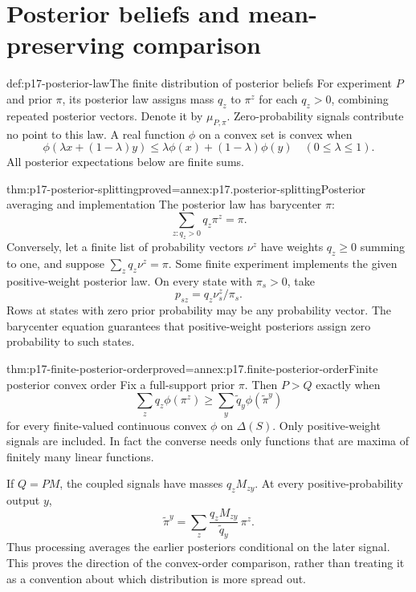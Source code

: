 \section{Posterior beliefs and mean-preserving comparison}
\label{sec:p17-posterior-comparison}

\begin{hbdefinition}{def:p17-posterior-law}{The finite distribution of posterior beliefs}
For experiment \(P\) and prior \(\pi\), its posterior law assigns mass
\(q_z\) to \(\pi^z\) for each \(q_z>0\), combining repeated posterior
vectors. Denote it by \(\mu_{P,\pi}\). Zero-probability signals contribute
no point to this law.
A real function \(\phi\) on a convex set is convex when
\[
 \phi(\lambda x+(1-\lambda)y)
       \leq\lambda\phi(x)+(1-\lambda)\phi(y)
       \quad(0\leq\lambda\leq1).
\]
All posterior expectations below are finite sums.
\end{hbdefinition}

\begin{hbtheorem}{thm:p17-posterior-splitting}{proved=annex:p17.posterior-splitting}{Posterior averaging and implementation}
The posterior law has barycenter \(\pi\):
\[
                         \sum_{z:q_z>0}q_z\pi^z=\pi.
\]
Conversely, let a finite list of probability vectors \(\nu^z\) have
weights \(q_z\geq0\) summing to one, and suppose
\(\sum_z q_z\nu^z=\pi\). Some finite experiment implements the given
positive-weight posterior law. On every state with \(\pi_s>0\), take
\[
                         p_{sz}=q_z\nu^z_s/\pi_s.
\]
Rows at states with zero prior probability may be any probability vector.
The barycenter equation guarantees that positive-weight posteriors assign
zero probability to such states.
\end{hbtheorem}

\begin{hbtheorem}{thm:p17-finite-posterior-order}{proved=annex:p17.finite-posterior-order}{Finite posterior convex order}
Fix a full-support prior \(\pi\). Then \(P>Q\) exactly when
\[
 \sum_z q_z\phi(\pi^z)
       \geq\sum_y \widetilde q_y\phi(\widetilde\pi^y)
\]
for every finite-valued continuous convex \(\phi\) on \(\Delta(S)\).
Only positive-weight signals are included.
In fact the converse needs only functions that are maxima of finitely
many linear functions.

If \(Q=PM\), the coupled signals have masses \(q_zM_{zy}\). At every
positive-probability output \(y\),
\[
       \widetilde\pi^y
          =\sum_z\frac{q_zM_{zy}}{\widetilde q_y}\,\pi^z.
\]
Thus processing averages the earlier posteriors conditional on the later
signal. This proves the direction of the convex-order comparison, rather
than treating it as a convention about which distribution is more spread out.
\end{hbtheorem}

